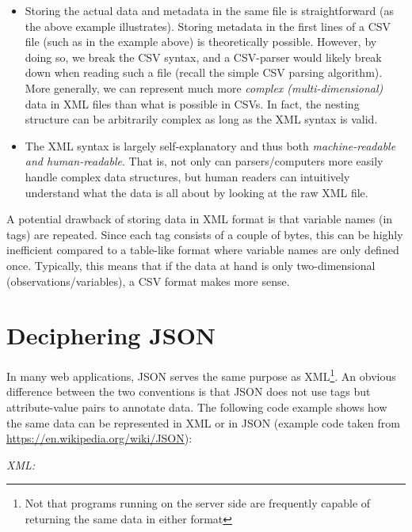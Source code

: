 \documentclass[
  12pt,
]{style/krantz}
\providecommand{\tightlist}{%
  \setlength{\itemsep}{0pt}\setlength{\parskip}{0pt}}
\begin{document}
\begin{itemize}
\tightlist
\item
  Storing the actual data and metadata in the same file is straightforward (as the above example illustrates). Storing metadata in the first lines of a CSV file (such as in the example above) is theoretically possible. However, by doing so, we break the CSV syntax, and a CSV-parser would likely break down when reading such a file (recall the simple CSV parsing algorithm). More generally, we can represent much more \emph{complex (multi-dimensional)} data in XML files than what is possible in CSVs. In fact, the nesting structure can be arbitrarily complex as long as the XML syntax is valid.
\item
  The XML syntax is largely self-explanatory and thus both \emph{machine-readable and human-readable}. That is, not only can parsers/computers more easily handle complex data structures, but human readers can intuitively understand what the data is all about by looking at the raw XML file.
\end{itemize}

A potential drawback of storing data in XML format is that variable names (in tags) are repeated. Since each tag consists of a couple of bytes, this can be highly inefficient compared to a table-like format where variable names are only defined once. Typically, this means that if the data at hand is only two-dimensional (observations/variables), a CSV format makes more sense.

\hypertarget{deciphering-json}{%
\section{Deciphering JSON}\label{deciphering-json}}

In many web applications, JSON serves the same purpose as XML\footnote{Not that programs running on the server side are frequently capable of returning the same data in either format}. An obvious difference between the two conventions is that JSON does not use tags but attribute-value pairs to annotate data. The following code example shows how the same data can be represented in XML or in JSON (example code taken from \url{https://en.wikipedia.org/wiki/JSON}):

\emph{XML:}
\end{document}
